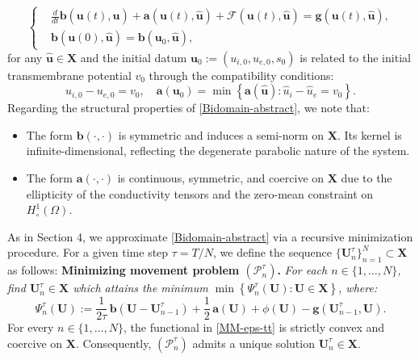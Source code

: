 \documentclass[a4paper,11pt]{article}
\theoremstyle{definition}
\numberwithin{equation}{section}
\begin{document}
\begin{equation}
	\label{Bidomain-abstract}
	\left\{
	\begin{aligned}
		&\frac{d}{dt} \mathbf{b}(\mathbf{u}(t), \widehat{\mathbf{u}}) + \mathbf{a}(\mathbf{u}(t), \widehat{\mathbf{u}}) + \mathcal{F}(\mathbf{u}(t), \widehat{\mathbf{u}}) = \mathbf{g}(\mathbf{u}(t), \widehat{\mathbf{u}}), \\
		&\mathbf{b}(\mathbf{u}(0), \widehat{\mathbf{u}}) = \mathbf{b}(\mathbf{u}_0, \widehat{\mathbf{u}}),
	\end{aligned}
	\right.
\end{equation}
for any $\widehat{\mathbf{u}} \in \mathbf{X}$ and the initial datum $\mathbf{u}_0 := (u_{i,0}, u_{e,0}, s_0)$ is related to the initial transmembrane potential $v_0$ through the compatibility conditions:
\begin{equation}\label{initial-condition-relation1}
	u_{i,0} - u_{e,0}= v_0, \quad \mathbf{a}(\mathbf{u}_0) = \min \left\{ \mathbf{a}(\widehat{\mathbf{u}}) : \widehat{u}_i - \widehat{u}_e = v_0\right\}.
\end{equation}
Regarding the structural properties of \eqref{Bidomain-abstract}, we note that:
\begin{itemize}
	\item The form $\mathbf{b}(\cdot, \cdot)$ is symmetric and induces a semi-norm on $\mathbf{X}$. Its kernel is infinite-dimensional, reflecting the degenerate parabolic nature of the system.
	\item The form $\mathbf{a}(\cdot, \cdot)$ is continuous, symmetric, and coercive on $\mathbf{X}$ due to the ellipticity of the conductivity tensors and the zero-mean constraint on $H_\circ^1(\Omega)$.
\end{itemize}

As in Section 4, we approximate \eqref{Bidomain-abstract} via a recursive minimization procedure. For a given time step $\tau = T/N$, we define the sequence $\{\mathbf{U}_n^\tau\}_{n=1}^N \subset \mathbf{X}$ as follows:
\vskip0.3cm
\noindent
\textbf{Minimizing movement problem $(\mathcal{P}^{\tau}_n)$.} \textit{For each $n \in \{ 1,\dots,N \}$, find $\mathbf{U}_n^{\tau}\in \mathbf{X}$ which attains the minimum $\min \left\{ \Psi_{n}^{\tau}(\mathbf{U}) : \mathbf{U} \in \mathbf{X} \right\}$, where:}
\begin{equation}
	\label{MM-eps-tt}
	\Psi_{n}^{\tau}(\mathbf{U}) := \frac{1}{2\tau}\, \mathbf{b}\left(\mathbf{U} - \mathbf{U}_{n-1}^\tau\right) + \frac{1}{2}\, \mathbf{a}(\mathbf{U}) + \phi(\mathbf{U}) - \mathbf{g}\left(\mathbf{U}_{n-1}^\tau, \mathbf{U}\right).
\end{equation}
For every $n \in \{1, \dots, N\}$, the functional in \eqref{MM-eps-tt} is strictly convex and coercive on $\mathbf{X}$. Consequently, $(\mathcal{P}_n^\tau)$ admits a unique solution $\mathbf{U}_n^\tau \in \mathbf{X}$.
\end{document}

